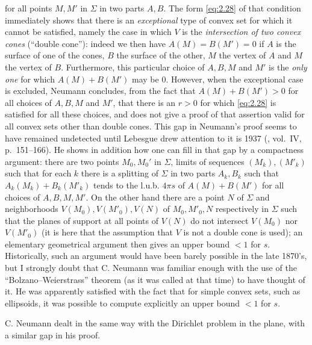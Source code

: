 \documentclass[12pt,a4paper,leqno,twoside]{extbook}
\begin{document}
for all points \(M, M'\) in \(\Sigma\) in two parts \(A, B\). The form \eqref{eq:2.28} of that condition immediately shows that there is an \emph{exceptional} type of convex set for which it cannot be satisfied, namely the case in which \(V\) is the \emph{intersection of two convex cones} (``double cone''): indeed we then have \(A(M) = B(M') = 0\) if \(A\) is the surface of one of the cones, \(B\) the surface of the other, \(M\) the vertex of \(A\) and \(M\) the vertex of \(B\). Furthermore, this particular choice of \(A, B, M\) and \(M'\) is the \emph{only one} for which \(A(M) + B(M')\) may be 0. However, when the exceptional case is excluded, Neumann concludes, from the fact that \(A(M) + B(M') > 0\) for all choices of \(A, B, M\) and \(M'\), that there is an \(r > 0\) for which \eqref{eq:2.28} is satisfied for all these choices, and does not give a proof of that assertion valid for all convex sets other than double cones. This gap in Neumann's proof seems to have remained undetected until Lebesgue drew attention to it is 1937 (\cite{138}, vol.~IV, p.~151--166). He shows in addition how one can fill in that gap by a compactness argument: there are two points \(M_0, M_0'\) in \(\Sigma\), limits of sequences \((M_k), (M'_k)\) such that for each \(k\) there is a splitting of \(\Sigma\) in two parts \(A_k, B_k\) such that \(A_k(M_k) + B_k(M'_k)\) tends to the l.u.b. \(4\pi s\) of \(A(M) + B(M')\) for all choices of \(A, B, M, M'\). On the other hand there are a point \(N\) of \(\Sigma\) and neighborhoods \(V(M_0), V(M'_0), V(N)\) of \(M_0, M'_0, N\) respectively in \(\Sigma\) such that the planes of support at all points of \(V(N)\) do not intersect \(V(M_0)\) nor \(V(M'_0)\) (it is here that the assumption that \(V\) is not a double cone is used); an elementary geometrical argument then gives an upper bound \(< 1\) for \(s\). Historically, such an argument would have been barely possible in the late 1870's, but I strongly doubt that C. Neumann was familiar enough with the use of the ``Bolzano--Weierstrass'' theorem (as it was called at that time) to have thought of it. He was apparently satisfied with the fact that for simple convex sets, such as ellipsoids, it was possible to compute explicitly an upper bound \(< 1\) for \(s\).

C. Neumann dealt in the same way with the Dirichlet problem in the plane, with a similar gap in his proof.
\end{document}
